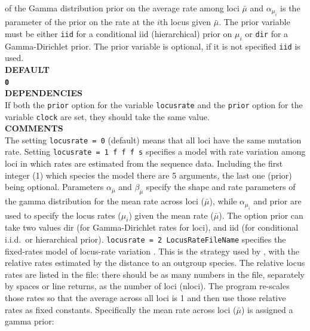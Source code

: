 \documentclass{book}
\numberwithin{equation}{section} \renewcommand{\baselinestretch}{0.55}
\begin{document}
of the Gamma distribution prior on the average rate among loci
$\bar{\mu}$ and $\alpha_{\mu_i}$ is the parameter of the prior on the
rate at the $i$th locus given $\bar{\mu}$. The prior variable must be
either \texttt{iid} for a conditional iid (hierarchical) prior on
$\mu_i$ or \texttt{dir} for a Gamma-Dirichlet prior. The prior
variable is optional, if it is not specified \texttt{iid} is used.
\vspace{5pt}\\
\textbf{DEFAULT} \vspace{5pt}\\
\textbf{\texttt{0}} \vspace{5pt}\\
\textbf{DEPENDENCIES} \vspace{5pt}\\
If both the \texttt{prior} option for the variable \texttt{locusrate}
and the \texttt{prior} option
for the variable \texttt{clock} are set, they should take the same value.  \vspace{5pt} \\
\textbf{COMMENTS} \vspace{5pt}\\
The setting \texttt{locusrate = 0} (default) means that all loci have
the same mutation rate.  Setting \texttt{locusrate = 1 f f f s}
specifies a model with rate variation among loci in which rates are
estimated from the sequence data.  Including the first integer (1)
which species the model there are 5 arguments, the last one (prior)
being optional.  Parameters $\alpha_{\bar{\mu}}$ and
$\beta_{\bar{\mu}}$ specify the shape and rate parameters of the gamma
distribution for the mean rate across loci ($\bar\mu$), while
$\alpha_{\mu_i}$ and prior are used to specify the locus rates
($\mu_i$) given the mean rate ($\bar\mu$). The option prior can take
two values dir (for Gamma-Dirichlet rates for loci), and iid (for
conditional i.i.d.\ or hierarchical prior).  \texttt{locusrate = 2
  LocusRateFileName} specifies the fixed-rates model of locus-rate
variation \citep{Burgess2008}.  This is the strategy used by
\citet{Yang2002}, with the relative rates estimated by the distance to
an outgroup species.  The relative locus rates are listed in the file:
there should be as many numbers in the file, separately by spaces or
line returns, as the number of loci (nloci).  The program re-scales
those rates so that the average across all loci is 1 and then use
those relative rates as fixed constants.  Specifically the mean rate
across loci ($\bar{\mu}$) is assigned a gamma prior:
\end{document}
